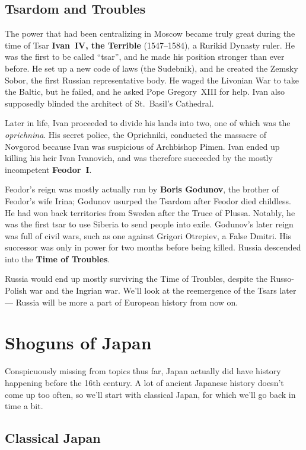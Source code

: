 \subsection*{Tsardom and Troubles}

The power that had been centralizing in Moscow became truly great during the time of
Tsar \textbf{Ivan~IV, the Terrible} (1547--1584), a Rurikid Dynasty ruler.
He was the first to be called ``tsar'', and he made his position stronger than ever before.
He set up a new code of laws (the Sudebnik), and he created the Zemsky Sobor, the first Russian representative body.
He waged the Livonian War to take the Baltic, but he failed, and he asked Pope Gregory~XIII for help.
Ivan also supposedly blinded the architect of St.\ Basil's Cathedral.

Later in life, Ivan proceeded to divide his lands into two, one of which was the \textit{oprichnina}.
His secret police, the Oprichniki, conducted the massacre of Novgorod because Ivan was suspicious of Archbishop Pimen.
Ivan ended up killing his heir Ivan Ivanovich,
and was therefore succeeded by the mostly incompetent \textbf{Feodor~I}.

Feodor's reign was mostly actually run by \textbf{Boris Godunov}, the brother of Feodor's wife Irina;
Godunov usurped the Tsardom after Feodor died childless.
He had won back territories from Sweden after the Truce of Plussa.
Notably, he was the first tsar to use Siberia to send people into exile.
Godunov's later reign was full of civil wars, such as one against Grigori Otrepiev, a False Dmitri.
His successor was only in power for two months before being killed.
Russia descended into the \textbf{Time of Troubles}.

Russia would end up mostly surviving the Time of Troubles, despite the Russo-Polish war and the Ingrian war.
We'll look at the reemergence of the Tsars later --- Russia will be more a part of European history from now on.

\section{Shoguns of Japan}

Conspicuously missing from topics thus far,
Japan actually did have history happening before the 16th century.
A lot of ancient Japanese history doesn't come up too often,
so we'll start with classical Japan, for which we'll go back in time a bit.

\subsection*{Classical Japan}

